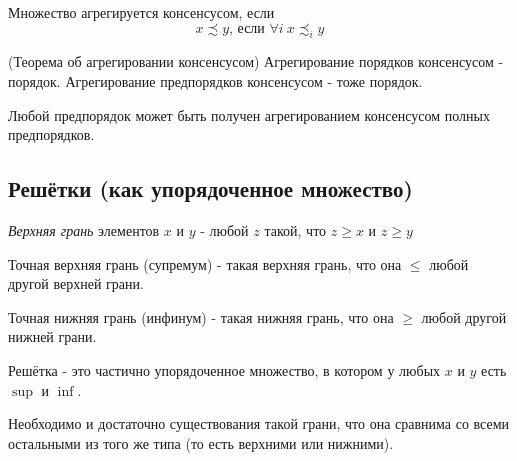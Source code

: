\begin{definition}
	Множество агрегируется консенсусом, если
	$$
		x \precsim y \textit{, если } \forall i\ x \precsim_i y
	$$
\end{definition}

\begin{theorem} (Теорема об агрегировании консенсусом)
	Агрегирование порядков консенсусом - порядок. Агрегирование предпорядков консенсусом - тоже порядок.
\end{theorem}

\begin{theorem}
	Любой предпорядок может быть получен агрегированием консенсусом полных предпорядков.
\end{theorem}

\subsection{Решётки (как упорядоченное множество)}

\begin{definition}
	\textit{Верхняя грань} элементов $x$ и $y$ - любой $z$ такой, что $z \ge x$ и $z \ge y$
\end{definition}

\begin{definition}
	Точная верхняя грань (супремум) - такая верхняя грань, что она $\le$ любой другой верхней грани.
\end{definition}

\begin{definition}
	Точная нижняя грань (инфинум) - такая нижняя грань, что она $\ge$ любой другой нижней грани.
\end{definition}

\begin{definition}
	Решётка - это частично упорядоченное множество, в котором у любых $x$ и $y$ есть $\sup$ и $\inf$.
\end{definition}

\begin{note}
	Необходимо и достаточно существования такой грани, что она сравнима со всеми остальными из того же типа (то есть верхними или нижними).
\end{note}
